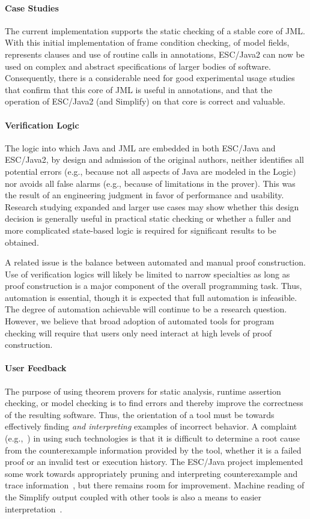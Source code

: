 \documentclass{llncs}
\begin{document}
\paragraph*{Case Studies} The current implementation supports the
static checking of a stable core of JML.  With this initial
implementation of frame condition checking, of model fields,
represents clauses and use of routine calls in annotations, ESC/Java2
can now be used on complex and abstract specifications of larger
bodies of software.  Consequently, there is a considerable need for
good experimental usage studies that confirm that this core of JML is
useful in annotations, and that the operation of ESC/Java2 (and
Simplify) on that core is correct and valuable.

\paragraph*{Verification Logic} The logic into which Java and JML are
embedded in both ESC/Java and ESC/Java2, by design and admission of
the original authors, neither identifies all potential errors (e.g., because not
all aspects of Java are modeled in the Logic) nor avoids all false alarms (e.g., 
because of limitations in the prover).  This was the
result of an engineering judgment in favor of performance and
usability.  Research studying expanded and larger use cases may show
whether this design decision is generally useful in practical static
checking or whether a fuller and more complicated state-based logic is
required for significant results to be obtained.

A related issue is the balance between automated and manual proof
construction.  Use of verification logics will likely be limited to
narrow specialties as long as proof construction is a major component
of the overall programming task.  Thus, automation is essential,
though it is expected that full automation is infeasible.  The degree
of automation achievable will continue to be a research question.
However, we believe that broad adoption of automated tools for program
checking will require that users only need interact at high levels of
proof construction.

\paragraph*{User Feedback} The purpose of using theorem provers for
static analysis, runtime assertion checking, or model checking is to
find errors and thereby improve the correctness of the resulting
software.  Thus, the orientation of a tool must be towards effectively
finding \emph{and interpreting} examples of incorrect behavior.  A
complaint (e.g.,~\cite{GroceVisser03}) in using such technologies is
that it is difficult to determine a root cause from the counterexample
information provided by the tool, whether it is a failed proof or an
invalid test or execution history.  The ESC/Java project implemented
some work towards appropriately pruning and interpreting
counterexample and trace information~\cite{PruningPaper}, but there
remains room for improvement.  Machine reading of the Simplify output
coupled with other tools is also a means to easier interpretation~\cite{csallner05check}.
\end{document}

